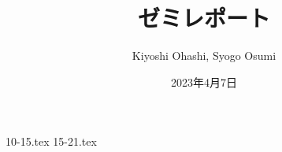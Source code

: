\documentclass{jsarticle}
\title{ゼミレポート}
\author{Kiyoshi Ohashi, Syogo Osumi}
\date{2023年4月7日}
\theoremstyle{definition}
\begin{document}
  \maketitle

  {10-15.tex}
  {15-21.tex}
\end{document}
